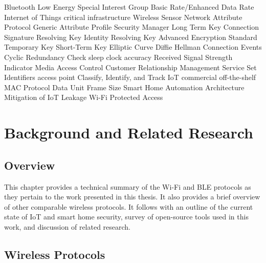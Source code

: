 \documentclass[12pt,letterpaper,oneside]{book}
\begin{document}
	\begin{acronym}
		 {Bluetooth Low Energy}
		 {Special Interest Group}
		 {Basic Rate/Enhanced Data Rate}
		 {Internet of Things}
		 {critical infrastructure}
		 {Wireless Sensor Network}
		 {Attribute Protocol}
		 {Generic Attribute Profile}
		 {Security Manager}
		 {Long Term Key}
		 {Connection Signature Resolving Key}
		 {Identity Resolving Key}
		 {Advanced Encryption Standard}
		 {Temporary Key}
		 {Short-Term Key}
		 {Elliptic Curve Diffie Hellman}
		 {Connection Events}
		 {Cyclic Redundancy Check}
		 {sleep clock accuracy}
		 {Received Signal Strength Indicator}
		 {Media Access Control}
		 {Customer Relationship Management}
		 {Service Set Identifiers}
		 {access point}
		 {Classify, Identify, and Track \ac{IoT}}
		 {commercial off-the-shelf}
		 {\ac{MAC} Protocol Data Unit}
		 {Frame Size}
		 {Smart Home Automation Architecture}
		 {Mitigation of \ac{IoT} Leakage}
		 {Wi-Fi Protected Access}
	\end{acronym}
\mainmatter
	\acresetall
	\chapter{Background and Related Research}
	
		\section{Overview}
		This chapter provides a technical summary of the Wi-Fi and \ac{BLE} protocols as they pertain to the work presented in this thesis. It also provides a brief overview of other comparable wireless protocols. It follows with an outline of the current state of \ac{IoT} and smart home security, survey of open-source tools used in this work, and discussion of related research.
		
		\section{Wireless Protocols}
\end{document}

